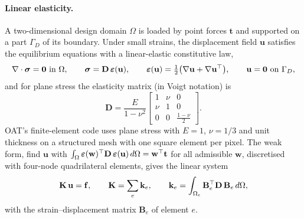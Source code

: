 \paragraph{Linear elasticity.} A two-dimensional design domain $\Omega$ is loaded by point forces $\mathbf t$ and supported on a part $\Gamma_D$ of its boundary. Under small strains, the displacement field $\mathbf u$ satisfies the equilibrium equations with a linear-elastic constitutive law,
\begin{equation}\label{eq:app-elasticity}
  \nabla\cdot\bm\sigma = \mathbf 0 \ \text{in}\ \Omega, \qquad \bm\sigma = \mathbf D\,\bm\varepsilon(\mathbf u), \qquad \bm\varepsilon(\mathbf u) = \tfrac12\big(\nabla\mathbf u + \nabla\mathbf u^{\top}\big), \qquad \mathbf u = \mathbf 0\ \text{on}\ \Gamma_D ,
\end{equation}
and for plane stress the elasticity matrix (in Voigt notation) is
\begin{equation}
  \mathbf D = \frac{E}{1-\nu^2}\begin{bmatrix}1 & \nu & 0\\ \nu & 1 & 0\\ 0 & 0 & \tfrac{1-\nu}{2}\end{bmatrix}.
\end{equation}
OAT's finite-element code uses plane stress with $E=1$, $\nu=1/3$ and unit thickness on a structured mesh with one square element per pixel. The weak form, find $\mathbf u$ with $\int_\Omega\bm\varepsilon(\mathbf w)^{\top}\mathbf D\,\bm\varepsilon(\mathbf u)\,d\Omega = \mathbf w^{\top}\mathbf t$ for all admissible $\mathbf w$, discretised with four-node quadrilateral elements, gives the linear system
\begin{equation}
  \mathbf K\,\mathbf u = \mathbf f, \qquad \mathbf K = \sum_e \mathbf k_e, \qquad \mathbf k_e = \int_{\Omega_e}\mathbf B_e^{\top}\mathbf D\,\mathbf B_e\,d\Omega ,
\end{equation}
with the strain--displacement matrix $\mathbf B_e$ of element $e$.

